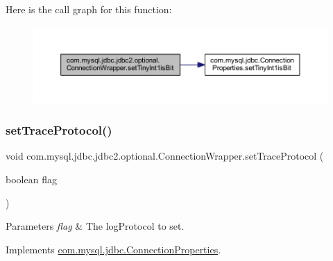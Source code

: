 Here is the call graph for this function\+:
\nopagebreak
\begin{figure}[H]
\begin{center}
\leavevmode
\includegraphics[width=350pt]{classcom_1_1mysql_1_1jdbc_1_1jdbc2_1_1optional_1_1_connection_wrapper_a6cad9c36cb924008caf164e37c618362_cgraph}
\end{center}
\end{figure}
\mbox{\label{classcom_1_1mysql_1_1jdbc_1_1jdbc2_1_1optional_1_1_connection_wrapper_a126325f8a5fd6f8b6800a4b8bb9a0131}} 
\subsubsection{\texorpdfstring{set\+Trace\+Protocol()}{setTraceProtocol()}}
{\footnotesize\ttfamily void com.\+mysql.\+jdbc.\+jdbc2.\+optional.\+Connection\+Wrapper.\+set\+Trace\+Protocol (\begin{DoxyParamCaption}\item[{boolean}]{flag }\end{DoxyParamCaption})}


\begin{DoxyParams}{Parameters}
{\em flag} & The log\+Protocol to set. \\
\hline
\end{DoxyParams}


Implements \mbox{\hyperlink{interfacecom_1_1mysql_1_1jdbc_1_1_connection_properties_a304661cd6d7b203e033ad219de96e0d7}{com.\+mysql.\+jdbc.\+Connection\+Properties}}.

